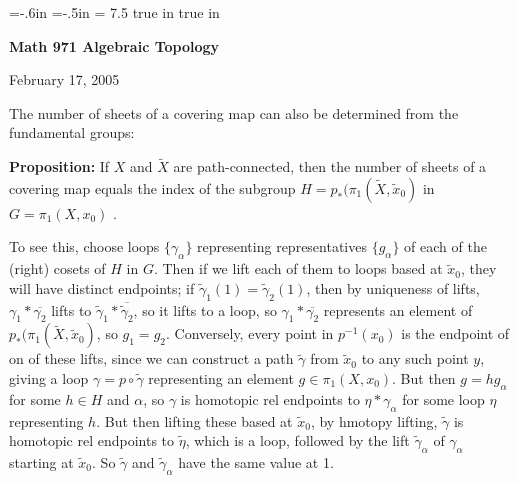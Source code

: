 
\overfullrule=0pt
\parindent=0pt

\nopagenumbers



\voffset=-.6in
\hoffset=-.5in
\hsize = 7.5 true in
 true in




\loadmsbm



\def\ctln{\centerline}
\def\u{\underbar}
\def\ssk{\smallskip}
\def\msk{\medskip}
\def\bsk{\bigskip}
\def\hsk{\hskip.1in}
\def\hhsk{\hskip.2in}
\def\dsl{\displaystyle}
\def\hskp{\hskip1.5in}

\def\lra{$\Leftrightarrow$ }
\def\ra{\rightarrow}
\def\mpto{\logmapsto}
\def\pu{\pi_1}
\def\mpu{$\pi_1$}
\def\sig{\Sigma}
\def\msig{$\Sigma$}
\def\ep{\epsilon}
\def\sset{\subseteq}
\def\del{\partial}
\def\inv{^{-1}}
\def\wtl{\widetilde}



\ctln{\bf Math 971 Algebraic Topology}

\ssk

\ctln{February 17, 2005}

\msk

The number of sheets of a covering map can also be determined 
from the fundamental groups:

\msk

{\bf Proposition:} If $X$ and $\wtl{X}$ are 
path-connected, then the number of sheets of a covering map equals
the index of the subgroup $H=p_*(\pu(\wtl{X},\wtl{x}_0)$ in 
$G=\pu(X,x_0)$ . 

\msk

To see this, choose loops $\{\gamma_\alpha\}$ representing representatives $\{g_\alpha\}$ of each of the (right) cosets of $H$ in $G$. Then if we lift
each of them to loops based at $\wtl{x}_0$, they will have distinct
endpoints; if $\wtl{\gamma}_1(1)=\wtl{\gamma}_2(1)$, then 
by uniqueness of lifts, $\gamma_1*\overline{\gamma_2}$ lifts to 
$\wtl{\gamma}_1*\overline{\wtl{\gamma}_2}$, so it
lifts to a loop, so $\gamma_1*\overline{\gamma_2}$ represents
an element of $p_*(\pu(\wtl{X},\wtl{x}_0)$, so $g_1=g_2$.
Conversely, every point in $p\inv(x_0)$ is the endpoint of on of these
lifts, since we can construct a path $\wtl{\gamma}$
from $\wtl{x}_0$ to any such point $y$, giving a loop
$\gamma=p\circ \wtl{\gamma}$ representing an element $g\in\pu(X,x_0)$.
But then $g=hg_\alpha$ for some $h\in H$ and $\alpha$, 
so $\gamma$ is homotopic rel endpoints to $\eta*\gamma_\alpha$ for some loop
$\eta$ representing $h$. But then lifting these based at $\wtl{x}_0$, by hmotopy
lifting, $\wtl{\gamma}$ is homotopic rel endpoints to $\wtl{\eta}$, which is a 
loop, followed by the lift $\wtl{\gamma}_\alpha$ of $\gamma_\alpha$
starting at $\wtl{x}_0$. So $\wtl{\gamma}$ and 
$\wtl{\gamma}_\alpha$ have the same value at 1.

